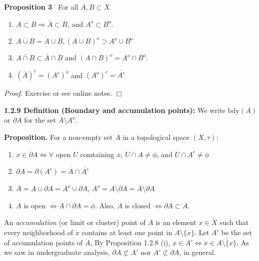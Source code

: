 \documentclass[12pt]{article}
\newcommand{\rimply}[0] { \Rightarrow }
\newcommand{\lrimply}[0] { \Leftrightarrow }
\begin{document}
\begin{flushleft}
 { \bf Proposition  3 } \  For all $A, B \subset X$\begin{enumerate}
\item
                $A \subset B \rimply \overline{A} \subset \overline{B}$, and $A^o \subset B^o$.
            \item
                $\overline{A \cup B} = \overline{A} \cup \overline{B}, ( A \cup B )^o \supset A^o \cup  B^o$
            \item
                $\overline{A \cap B} \subset \overline{A} \cap \overline{B}$ and $ (A \cap B)^o = A^o \cap B^o$.
            \item
                $(\overline{A})^c = (A^c)^o$ and $(A^o)^c = \overline{A^c}$
            \end{enumerate}\begin{flushleft} 
 \emph{Proof.  }Exercise or see online notes. $\Box$ 
\end{flushleft}\end{flushleft}\begin{flushleft} 
 { \bf 1.2.9 Definition (Boundary and accumulation points):} We write
 $\textrm{bdy}(A)$ or $\partial A$ for the set
$\overline{A} \setminus A^o$.  
\end{flushleft}\begin{flushleft} 
 { \bf Proposition. }For a non-empty set $A$ in a topological space $(X, \tau)$:\begin{enumerate}[i]
\item
                $x \in \partial A \lrimply \forall $ open $U$ comtaining $x$, $U \cap A \not = \phi$, and $U \cap A^c \not = \phi$
            \item
                $\partial A = \partial (A ^c) = \overline{A} \cap \overline{A^c}$
            \item
                $\overline{A} = A \cup \partial A = A^o \cup \partial A$, $A^o = A \setminus \partial A = \overline{A} \setminus \partial A$
            \item
                $A$ is open $\lrimply A \cap \partial A = \phi$.  
Also, $A$ is closed $\lrimply \partial A \subset A$.
            \end{enumerate}
An {\em accumulation} (or limit or cluster) point of $A$ is an
element $x \in X$ such that every neighborhood of $x$ contains at least one point in $A \setminus \{ x \}$.
Let $A'$ be the set of accumulation points of $A$, By Proposition 1.2.8 
(i), $x \in A' \lrimply x \in \overline{ A \setminus \{ x \}}$. As we saw in undergraduate analysis, $\partial A \not \subset A'$ nor $A' \not \subset \partial A$, in general.\end{flushleft}\begin{flushleft} 


\end{flushleft}
\end{document}
